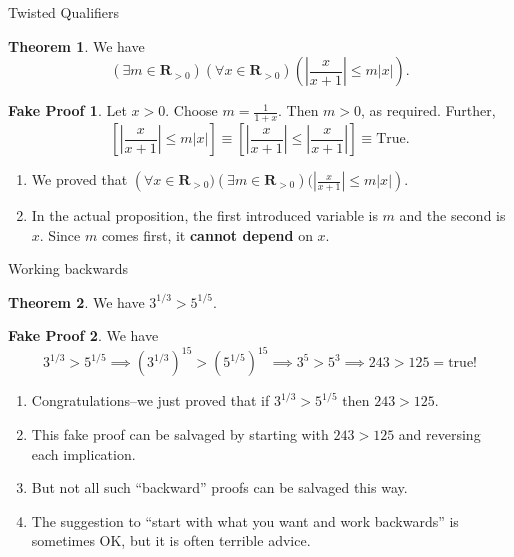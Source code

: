 \documentclass[fleqn]{beamer}
\newcommand{\reals}{\mathbf{R}}
\theoremstyle{definition}
\newtheorem{myth}{Theorem}
\newtheorem{myfakeproof}{Fake Proof}
\begin{document}
\begin{frame}{Twisted Qualifiers}

\begin{myth}  We have
\[
   \left (\exists m \in \reals_{> 0} \right) \left (\forall x \in  \reals_{> 0} \right) \left(\left| \frac{x}{x+1} \right| \leq m |x| \right).
\]
\end{myth}
\begin{myfakeproof}    Let \(x > 0\).  Choose \(m = \frac{1}{1+x}\).  Then \(m > 0\), as required. Further,
\[
   \left [ \left | \frac{x}{x+1} \right | \leq m |x| \right] \equiv  \left [\left| \frac{x}{x+1} \right| \leq \left| \frac{x}{x+1} \right| \right] \equiv \mbox{True}.
\]
\end{myfakeproof}
\begin{enumerate}

\item We proved that  \( \left (\forall x \in  \reals_{> 0}) \left (\exists m \in \reals_{> 0} \right)  (\left| \frac{x}{x+1} \right| \leq m |x| \right) \).

\item In the actual proposition, the first introduced variable is \(m\) and the second is \(x\).  Since \(m\) comes first, it \textbf{cannot depend} on \(x\).

\end{enumerate}

\end{frame}
\begin{frame}{Working backwards}

\begin{myth} We have \(3^{1/3} > 5^{1/5} \). \end{myth}

\begin{myfakeproof}
We have
\small
\[
   3^{1/3} > 5^{1/5} \implies (3^{1/3})^{15} > (5^{1/5})^{15} \implies 3^5> 5^3 \implies 243 > 125  =  \mathrm{true!}
\]
\end{myfakeproof}

\begin{enumerate}
\item Congratulations--we just proved that if  \(3^{1/3} > 5^{1/5}\) then \( 243 > 125\).

\item This fake proof can be salvaged by starting with \( 243 > 125\) and reversing each implication.

\item But not all such ``backward'' proofs can be salvaged this way.

\item The  suggestion to ``start with what you want and work backwards'' is sometimes OK, but it
is often terrible advice.
\end{enumerate}
\end{frame}
\end{document}
